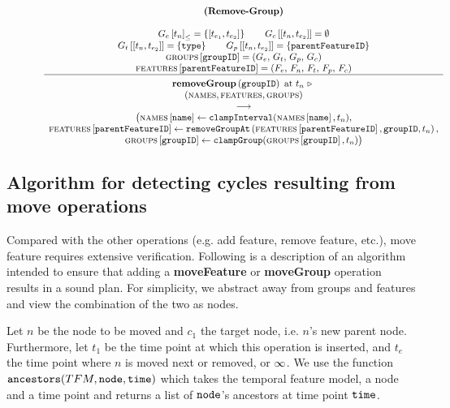 \begin{figure}[h]
    \renewcommand{\arraystretch}{1.1}
    \sossize$$\begin{array}{c}
      \ntyperule{Remove-Group}
      {\\
        \containing{G_e}{t_n} = \set{\interval{t_{e_1}}{t_{e_2}}} \qquad
        \lookup{G_c}{\interval{t_{n}}{t_{e_2}}} = \emptyset \\
        \lookup{G_t}{\interval{t_n}{t_{e_2}}} = \set{\var{type}} \qquad
        \lookup{G_p}{\interval{t_n}{t_{e_2}}} = \set{\var{parentFeatureID}} \\
        \lookup{\groups{}}{\var{groupID}} = \group \\
        \lookup{\features{}}{\var{parentFeatureID}} = \feature
      }
      {
        \textbf{removeGroup}\left( \var{groupID}\right) \text{ at } t_n \shove \\
        (\names{}, \features{}, \groups{}) \\
        \transition \\
        \big(\lookup{\names{}}{\var{name}} \assign \var{clampInterval}(\lookup{\names{}}{\var{name}}, t_n),\\
          \lookup{\features{}}{\var{parentFeatureID}} \assign \var{removeGroupAt}\left(\lookup{\features}{\var{parentFeatureID}}, \var{groupID}, t_n\right) ,\\
        \lookup{\groups{}}{\var{groupID}} \assign \var{clampGroup}(\lookup{\groups{}}{\var{groupID}}, t_n) \big)
      }
    \end{array}$$
  \caption{\label{rule:remove-group}}
\end{figure}

\subsection{Algorithm for detecting cycles resulting from \textbf{move} operations}
\label{sub:move-algorithm}

Compared with the other operations (e.g. add feature, remove feature, etc.), move feature requires extensive verification. Following is a description of an algorithm intended to ensure that adding a \textbf{moveFeature} or \textbf{moveGroup} operation results in a sound plan. For simplicity, we abstract away from groups and features and view the combination of the two as nodes. 

Let $n$ be the node to be moved and $c_1$ the target node, i.e. $n$'s new parent node. Furthermore, let $t_1$ be the time point at which this operation is inserted, and $t_e$ the time point where $n$ is moved next or removed, or $\infty$. We use the function $\texttt{ancestors}(TFM, \texttt{node}, \texttt{time})$ which takes the temporal feature model, a node and a time point and returns a list of $\texttt{node}$'s ancestors at time point $\texttt{time}$. 

